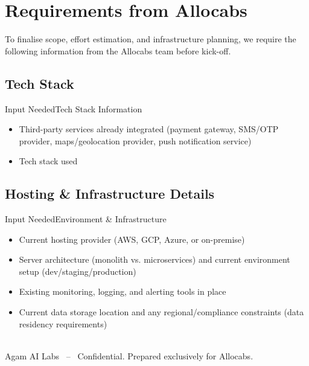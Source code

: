 \documentclass[11pt,a4paper]{article}
\begin{document}
\section{Requirements from Allocabs}
To finalise scope, effort estimation, and infrastructure planning, we require the following information from the Allocabs team before kick-off.

\subsection{Tech Stack}
\begin{issuebox}{Input Needed}{Tech Stack Information}
\begin{itemize}
  \item Third-party services already integrated (payment gateway, SMS/OTP provider, maps/geolocation provider, push notification service)
  \item Tech stack used
\end{itemize}
\end{issuebox}

\subsection{Hosting \& Infrastructure Details}
\begin{issuebox}{Input Needed}{Environment \& Infrastructure}
\begin{itemize}
  \item Current hosting provider (AWS, GCP, Azure, or on-premise)
  \item Server architecture (monolith vs. microservices) and current environment setup (dev/staging/production)
  \item Existing monitoring, logging, and alerting tools in place
  \item Current data storage location and any regional/compliance constraints (data residency requirements)
\end{itemize}
\end{issuebox}

\vfill
\noindent{\color{linegray}\rule{\linewidth}{0.6pt}}\\[6pt]
\fontsize{8.3}{10}\selectfont\textcolor{softgray}{Agam AI Labs \ -- \ Confidential. Prepared exclusively for Allocabs.}
\end{document}
